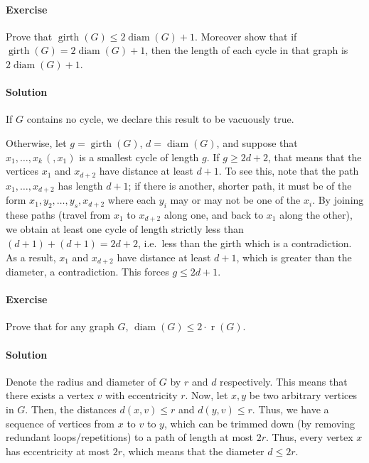 \documentclass[10pt]{article}
\newcounter{prob}
\newcommand{\problem}{\stepcounter{prob}\paragraph{Exercise \arabic{prob}}}
\newcommand{\solution}{\paragraph{Solution}}
\DeclareMathOperator{\diam}{diam}
\DeclareMathOperator{\girth}{girth}
\begin{document}
    \problem Prove that $\girth(G) \leq 2\diam(G) + 1$. Moreover show that if
    $\girth(G) = 2\diam(G) + 1$, then the length of each cycle in that graph is
    $2\diam(G) + 1$.


    \solution If $G$ contains no cycle, we declare this result to be vacuously true.

    Otherwise, let $g = \girth(G)$, $d = \diam(G)$, and suppose that $x_1, \dots,
    x_k\, (, x_1)$ is a smallest cycle of length $g$. If $g \geq 2d + 2$, that means
    that the vertices $x_1$ and $x_{d + 2}$ have distance at least $d + 1$. To see
    this, note that the path $x_1, \dots, x_{d + 2}$ has length $d + 1$; if there is
    another, shorter path, it must be of the form $x_1, y_2, \dots, y_{s}, x_{d +
    2}$ where each $y_i$ may or may not be one of the $x_i$. By joining these paths
    (travel from $x_1$ to $x_{d + 2}$ along one, and back to $x_1$ along the other),
    we obtain at least one cycle of length strictly less than $(d + 1) + (d + 1) = 2d
    + 2$, i.e.\ less than the girth which is a contradiction. As a result, $x_1$ and
    $x_{d + 2}$ have distance at least $d + 1$, which is greater than the diameter, a
    contradiction. This forces $g \leq 2d + 1$.



    \problem Prove that for any graph $G$, $\diam(G) \leq 2\cdot
    \operatorname{r}(G)$.

    \solution Denote the radius and diameter of $G$ by $r$ and $d$ respectively.
    This means that there exists a vertex $v$ with eccentricity $r$. Now, let $x, y$
    be two arbitrary vertices in $G$. Then, the distances $d(x, v) \leq r$ and $d(y,
    v) \leq r$. Thus, we have a sequence of vertices from $x$ to $v$ to $y$, which
    can be trimmed down (by removing redundant loops/repetitions) to a path of length
    at most $2r$. Thus, every vertex $x$ has eccentricity at most $2r$, which means
    that the diameter $d \leq 2r$.
\end{document}
